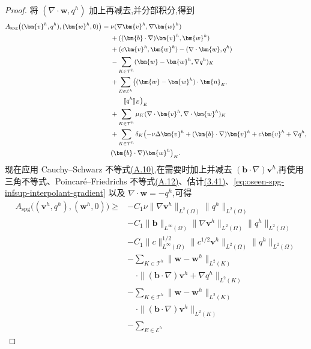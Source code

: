 \begin{proof}
将 $(\nabla\cdot\bm{w},q^h)$ 加上再减去,并分部积分,得到
\begin{equation*}
\small
\begin{aligned}
 A_{\mathrm{spg}}\bigl((\bm{v}^h,q^h),(\bm{w}^h,0)\bigr)
 ={}&\nu(\nabla\bm{v}^h,\nabla\bm{w}^h)\\
 &+((\bm{b}\cdot\nabla)\bm{v}^h,\bm{w}^h)\\
 &+(c\bm{v}^h,\bm{w}^h)-(\nabla\cdot\bm{w},q^h)\\
 &-\sum_{K\in\mathcal{T}^h}
       (\bm{w}-\bm{w}^h,\nabla q^h)_K\\
 &+\sum_{E\in\mathcal{E}^h}
       \bigl((\bm{w}-\bm{w}^h)\cdot\bm{n}_E,\\
 &\qquad[\![q^h]\!]_E\bigr)_E\\
 &+\sum_{K\in\mathcal{T}^h}
       \mu_K(\nabla\cdot\bm{v}^h,\nabla\cdot\bm{w}^h)_K\\
 &+\sum_{K\in\mathcal{T}^h}\delta_K
       \bigl(-\nu\Delta\bm{v}^h+(\bm{b}\cdot\nabla)\bm{v}^h
                    +c\bm{v}^h+\nabla q^h,\\
 &(\bm{b}\cdot\nabla)\bm{w}^h\bigr)_K.
\end{aligned}
\end{equation*}
现在应用 Cauchy--Schwarz 不等式\hyperref[eq:appendix-a-10]{(A.10)},在需要时加上并减去 $(\bm{b}\cdot\nabla)\bm{v}^h$,再使用三角不等式、Poincaré--Friedrichs 不等式\hyperref[eq:appendix-a-12]{(A.12)}、估计\hyperref[eq:divergence-gradient-bound-h1]{(3.41)}、\cref{eq:oseen-spg-infsup-interpolant-gradient} 以及 $\nabla\cdot\bm{w}=-q^h$,可得
\begin{equation*}
\begin{aligned}
 A_{\mathrm{spg}}\bigl((\bm{v}^h,q^h),(\bm{w}^h,0)\bigr)
 \ge{}&-C_1\nu\|\nabla\bm{v}^h\|_{L^2(\Omega)}
          \|q^h\|_{L^2(\Omega)}\\
 &-C_1\|\bm{b}\|_{L^\infty(\Omega)}
          \|\nabla\bm{v}^h\|_{L^2(\Omega)}
          \|q^h\|_{L^2(\Omega)}\\
 &-C_1\|c\|_{L^\infty(\Omega)}^{1/2}
          \|c^{1/2}\bm{v}^h\|_{L^2(\Omega)}
          \|q^h\|_{L^2(\Omega)}\\
 &-\sum_{K\in\mathcal{T}^h}
       \|\bm{w}-\bm{w}^h\|_{L^2(K)}\\
 &\quad\cdot\|(\bm{b}\cdot\nabla)\bm{v}^h+\nabla q^h\|_{L^2(K)}\\
 &-\sum_{K\in\mathcal{T}^h}
       \|\bm{w}-\bm{w}^h\|_{L^2(K)}\\
 &\quad\cdot\|(\bm{b}\cdot\nabla)\bm{v}^h\|_{L^2(K)}\\
 &-\sum_{E\in\mathcal{E}^h}

\end{aligned}
\end{equation*}
\end{proof}

